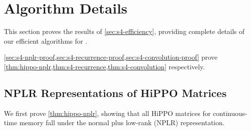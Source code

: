 \section{\methodabbrv{} Algorithm Details}
\label{sec:s4-details}

This section proves the results of \cref{sec:s4-efficiency}, providing complete details of our efficient algorithms for \methodabbrv{}.

\cref{sec:s4-nplr-proof,sec:s4-recurrence-proof,sec:s4-convolution-proof}
prove \cref{thm:hippo-nplr,thm:s4-recurrence,thm:s4-convolution}
respectively.

\subsection{NPLR Representations of HiPPO Matrices}
\label{sec:s4-nplr-proof}

We first prove \cref{thm:hippo-nplr},
showing that all HiPPO matrices for continuous-time memory fall under the \methodabbrv{} normal plus low-rank (NPLR) representation.

